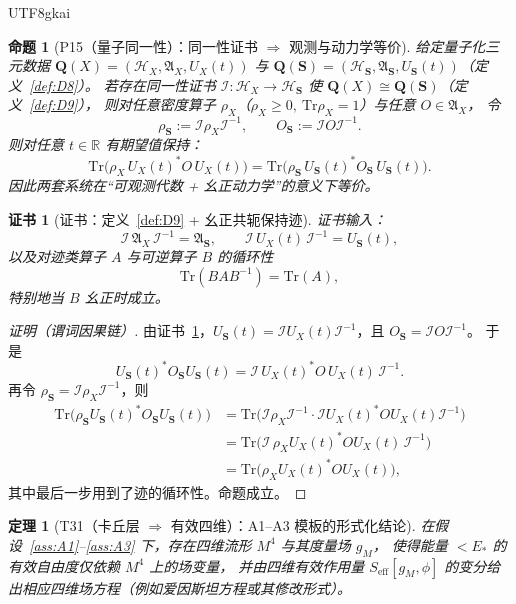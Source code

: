 \documentclass[12pt]{article}
\newtheorem{theorem}{定理}[section]
\newtheorem{proposition}{命题}[section]
\newtheorem{Certificate}{证书}[section]
\begin{document}
\begin{CJK*}{UTF8}{gkai}
\begin{proposition}[P15（量子同一性）：同一性证书 $\Rightarrow$ 观测与动力学等价]
\label{prop:P15}
给定量子化三元数据 $\mathbf Q(X)=(\mathcal H_X,\mathfrak A_X,U_X(t))$ 与 $\mathbf Q(\mathbf S)=(\mathcal H_{\mathbf S},\mathfrak
  A_{\mathbf S},U_{\mathbf S}(t))$（定义~\ref{def:D8}）。
若存在同一性证书 $\mathcal I:\mathcal H_X\to\mathcal H_{\mathbf S}$ 使 $\mathbf Q(X)\cong \mathbf Q(\mathbf S)$（定义~\ref{def:D9}），
则对任意密度算子 $\rho_X$（$\rho_X\ge0,\ \mathrm{Tr}\rho_X=1$）与任意 $O\in\mathfrak A_X$，
令
\[
\rho_{\mathbf S}:=\mathcal I\rho_X\mathcal I^{-1},\qquad
O_{\mathbf S}:=\mathcal I O\mathcal I^{-1}.
\]
则对任意 $t\in\mathbb R$ 有期望值保持：
\[
\mathrm{Tr}\big(\rho_X\,U_X(t)^\ast O\,U_X(t)\big)
=
\mathrm{Tr}\big(\rho_{\mathbf S}\,U_{\mathbf S}(t)^\ast O_{\mathbf S}\,U_{\mathbf S}(t)\big).
\]
因此两套系统在“可观测代数 + 幺正动力学”的意义下等价。
\end{proposition}

\begin{Certificate}[证书：定义~\ref{def:D9} + 幺正共轭保持迹]
\label{cert:P15}
证书输入：
\[
\mathcal I\,\mathfrak A_X\,\mathcal I^{-1}=\mathfrak A_{\mathbf S},
\qquad
\mathcal I\,U_X(t)\,\mathcal I^{-1}=U_{\mathbf S}(t),
\]
以及对迹类算子 $A$ 与可逆算子 $B$ 的循环性
\[
\mathrm{Tr}(BAB^{-1})=\mathrm{Tr}(A),
\]
特别地当 $B$ 幺正时成立。
\end{Certificate}

\begin{proof}[证明（谓词因果链）]
由证书~\ref{cert:P15}，$U_{\mathbf S}(t)=\mathcal I U_X(t)\mathcal I^{-1}$，且 $O_{\mathbf S}=\mathcal I O\mathcal I^{-1}$。
于是
\[
U_{\mathbf S}(t)^\ast O_{\mathbf S}U_{\mathbf S}(t)
=
\mathcal I\,U_X(t)^\ast O\,U_X(t)\,\mathcal I^{-1}.
\]
再令 $\rho_{\mathbf S}=\mathcal I\rho_X\mathcal I^{-1}$，则
\[
\begin{aligned}
\mathrm{Tr}\big(\rho_{\mathbf S}U_{\mathbf S}(t)^\ast O_{\mathbf S}U_{\mathbf S}(t)\big)
&=\mathrm{Tr}\big(\mathcal I\rho_X\mathcal I^{-1}\cdot \mathcal I U_X(t)^\ast O U_X(t)\mathcal I^{-1}\big)\\
&=\mathrm{Tr}\big(\mathcal I\,\rho_X U_X(t)^\ast O U_X(t)\,\mathcal I^{-1}\big)\\
&=\mathrm{Tr}\big(\rho_X U_X(t)^\ast O U_X(t)\big),
\end{aligned}
\]
其中最后一步用到了迹的循环性。命题成立。
\end{proof}

\begin{theorem}[T31（卡丘层 $\Rightarrow$ 有效四维）：A1--A3 模板的形式化结论]
\label{thm:T31}
在假设~\ref{ass:A1}--\ref{ass:A3} 下，存在四维流形 $M^4$ 与其度量场 $g_M$，
使得能量 $<E_\ast$ 的有效自由度仅依赖 $M^4$ 上的场变量，
并由四维有效作用量 $S_{\mathrm{eff}}[g_M,\phi]$ 的变分给出相应四维场方程（例如爱因斯坦方程或其修改形式）。
\end{theorem}


\end{CJK*}
\end{document}
